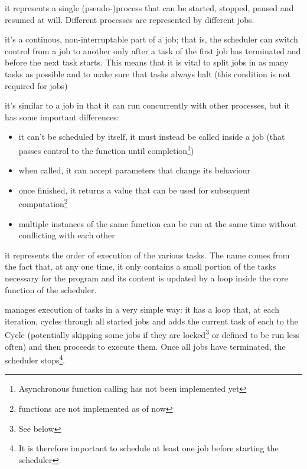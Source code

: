   \begin{description}[align=right, itemindent=0pt]
    \item [Job] it represents a single (pseudo-)process that can be
      started, stopped, paused and resumed at will. Different
      processes are represented by different jobs.
    \item [Task] it's a continous, non-interruptable part of a job;
      that is, the scheduler can switch control from a job to
      another only after a task of the first job has terminated and
      before the next task starts. This means that it is vital to
      split jobs in as many tasks as possible and to make sure that
      tasks always halt (this condition is not required for jobs)
    \item [Function] it's similar to a job in that it can run
      concurrently with other processes, but it has some important
      differences:
      \begin{itemize}
        \item it can't be scheduled by itself, it must instead be
          called inside a job (that passes control to the function
          until completion\footnote{Asynchronous function calling
          has not been implemented yet})
        \item when called, it can accept parameters that change its
          behaviour
        \item once finished, it returns a value that can be used for
          subsequent computation\footnote{ functions are
          not implemented as of now}
        \item multiple instances of the same function can be run at
          the same time without conflicting with each other
      \end{itemize}
    \item [Cycle] it represents the order of execution of the
      various tasks. The name comes from the fact that, at any one
      time, it only contains a small portion of the tasks necessary
      for the program and its content is updated by a loop inside
      the core function of the scheduler.
  \end{description}
  
  \ScheMo{} manages execution of tasks in a very simple way: it has a
  loop that, at each iteration, cycles through all started jobs and
  adds the current task of each to the Cycle (potentially skipping
  some jobs if they are locked\footnote{See below} or defined to be
  run less often) and then proceeds to execute them. Once all jobs
  have terminated, the scheduler stops\footnote{It is therefore
  important to schedule at least one job before starting the
  scheduler}.

